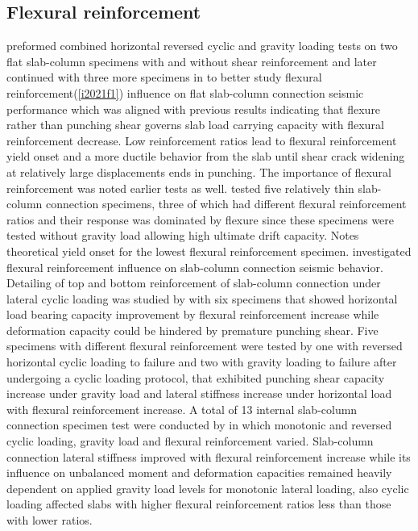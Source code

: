 \documentclass[twocolumn]{article} %
\begin{document}
\subsection{Flexural reinforcement}
\cite{isufi2020} preformed combined horizontal reversed cyclic and gravity loading tests on two flat slab-column specimens with and without shear reinforcement and later continued with three more specimens in \cite{isufi2021} to better study flexural reinforcement(\ref{i2021f1}) influence on flat slab-column connection seismic performance which was aligned with previous results\citep{muttoni2008punching,guandalini2009punching,ghali2019,torabian2019} indicating that flexure rather than punching shear governs slab load carrying capacity with flexural reinforcement decrease. Low reinforcement ratios lead to flexural reinforcement yield onset and a more ductile behavior from the slab until shear crack widening at relatively large displacements ends in punching\citep{muttoni2008punching,torabian2020,torabian2019}. The importance of flexural reinforcement was noted earlier tests as well\citep{hawkins1974w,symonds1976}. \cite{morrison1983lateral} tested five relatively thin slab-column connection specimens, three of which had different flexural reinforcement ratios and their response was dominated by flexure since these specimens were tested without gravity load allowing high ultimate drift capacity. \cite{morrison1983lateral} Notes theoretical yield onset for the lowest flexural reinforcement specimen. \cite{emam1997seismic,marzouk2001cyclic} investigated flexural reinforcement influence on slab-column connection seismic behavior. Detailing of top and bottom reinforcement of slab-column connection under lateral cyclic loading was studied by \cite{Robertson2006} with six specimens that showed horizontal load bearing capacity improvement by flexural reinforcement increase while deformation capacity could be hindered by premature punching shear.  Five specimens with different flexural reinforcement were tested by \cite{tian2008behavior} one with reversed horizontal cyclic loading to failure and two with gravity loading to failure after undergoing a cyclic loading protocol, that exhibited punching shear capacity increase under gravity load and lateral stiffness increase under horizontal load with flexural reinforcement increase. A total of 13 internal slab-column connection specimen test were conducted by \cite{drakatos2016} in which monotonic and reversed cyclic loading, gravity load and flexural reinforcement varied. Slab-column connection lateral stiffness improved with flexural reinforcement increase while its influence on unbalanced moment and deformation capacities remained heavily dependent on applied gravity load levels for monotonic lateral loading, also cyclic loading affected slabs with higher flexural reinforcement ratios less than those with lower ratios. 
\end{document}
